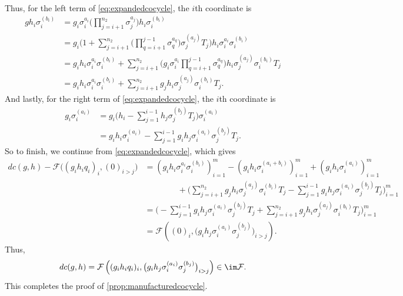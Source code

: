 \documentclass{article}
\numberwithin{equation}{section}
\begin{document}
Thus, for the left term of \autoref{eq:expandedcocycle}, the $i$th coordinate is
\begin{align*}
	gh_i\sigma_i^{(b_i)} &= g_i\sigma_i^{a_i}\Bigg(\prod_{ j=i+1}^{n_2}\sigma_j^{a_j}\Bigg)h_i\sigma_i^{(b_i)} \\
	&= g_i\Bigg(1+\sum_{j=i+1}^{n_2}\Bigg(\prod_{q=i+1}^{j-1}\sigma_q^{a_q}\Bigg)\sigma_j^{(a_j)}T_j\Bigg)h_i\sigma_i^{a_i}\sigma_i^{(b_i)} \\
	&= g_ih_i\sigma_i^{a_i}\sigma_i^{(b_i)}+\sum_{j=i+1}^{n_2}\Bigg(g_i\sigma_i^{a_i}\prod_{q=i+1}^{j-1}\sigma_q^{a_q}\Bigg)h_i\sigma_j^{(a_j)}\sigma_i^{(b_i)}T_j \\
	&= g_ih_i\sigma_i^{a_i}\sigma_i^{(b_i)}+\sum_{j=i+1}^{n_2}g_jh_i\sigma_j^{(a_j)}\sigma_i^{(b_i)}T_j.
\end{align*}
And lastly, for the right term of \autoref{eq:expandedcocycle}, the $i$th coordinate is
\begin{align*}
	g_i\sigma_i^{(a_i)} &= g_i\Bigg(h_i-\sum_{j=1}^{i-1}h_j\sigma_j^{(b_j)}T_j\Bigg)\sigma_i^{(a_i)} \\
	&= g_ih_i\sigma_i^{(a_i)}-\sum_{j=1}^{i-1}g_ih_j\sigma_i^{(a_i)}\sigma_j^{(b_j)}T_j.
\end{align*}
So to finish, we continue from \autoref{eq:expandedcocycle}, which gives
\begin{align*}
	dc(g,h)-\mathcal F\big((g_ih_iq_i)_i,(0)_{i>j}\big) &= \left(g_ih_i\sigma_i^{a_i}\sigma_i^{(b_i)}\right)_{i=1}^m-\left(g_ih_i\sigma_i^{(a_i+b_i)}\right)_{i=1}^m+\left(g_ih_i\sigma_i^{(a_i)}\right)_{i=1}^m \\
	&\qquad\qquad+\Bigg(\sum_{j=i+1}^{n_2}g_jh_i\sigma_j^{(a_j)}\sigma_i^{(b_i)}T_j-\sum_{j=1}^{i-1}g_ih_j\sigma_i^{(a_i)}\sigma_j^{(b_j)}T_j\Bigg)_{i=1}^m \\
	&= \Bigg(-\sum_{j=1}^{i-1}g_ih_j\sigma_i^{(a_i)}\sigma_j^{(b_j)}T_j+\sum_{j=i+1}^{n_2}g_jh_i\sigma_j^{(a_j)}\sigma_i^{(b_i)}T_j\Bigg)_{i=1}^m \\
	&= \mathcal F\left((0)_i,\big(g_ih_j\sigma_i^{(a_i)}\sigma_j^{(b_j)}\big)_{i>j}\right).
\end{align*}
Thus,
\begin{equation}
	dc(g,h) = \mathcal F\left((g_ih_iq_i)_i,\big(g_ih_j\sigma_i^{(a_i)}\sigma_j^{(b_j)}\big)_{i>j}\right)\in\im\mathcal F. \label{eq:computedelta}
\end{equation}
This completes the proof of \autoref{prop:manufacturedcocycle}.
\end{document}
